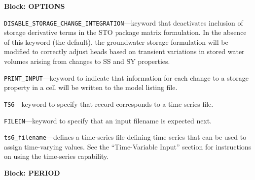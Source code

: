 
\item \textbf{Block: OPTIONS}

\begin{description}
\item \texttt{DISABLE\_STORAGE\_CHANGE\_INTEGRATION}---keyword that deactivates inclusion of storage derivative terms in the STO package matrix formulation.  In the absence of this keyword (the default), the groundwater storage formulation will be modified to correctly adjust heads based on transient variations in stored water volumes arising from changes to SS and SY properties.

\item \texttt{PRINT\_INPUT}---keyword to indicate that information for each change to a storage property in a cell will be written to the model listing file.

\item \texttt{TS6}---keyword to specify that record corresponds to a time-series file.

\item \texttt{FILEIN}---keyword to specify that an input filename is expected next.

\item \texttt{ts6\_filename}---defines a time-series file defining time series that can be used to assign time-varying values. See the ``Time-Variable Input'' section for instructions on using the time-series capability.

\end{description}
\item \textbf{Block: PERIOD}

